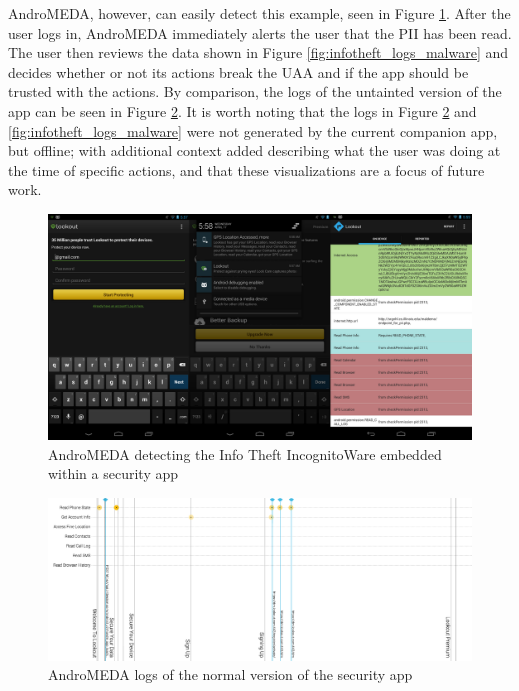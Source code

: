 \documentclass{acm_proc_article-sp}
\begin{document}
AndroMEDA, however, can easily detect this example, seen in Figure \ref{fig:infotheft_visual}. After the user logs in, AndroMEDA immediately alerts the user that the PII has been read. The user then reviews the data shown in Figure \ref{fig:infotheft_logs_malware} and decides whether or not its actions break the UAA and if the app should be trusted with the actions. By comparison, the logs of the untainted version of the app can be seen in Figure \ref{fig:infotheft_logs_nonmalware}. It is worth noting that the logs in Figure \ref{fig:infotheft_logs_nonmalware} and \ref{fig:infotheft_logs_malware} were not generated by the current companion app, but offline; with additional context added describing what the user was doing at the time of specific actions, and that these visualizations are a focus of future work.

\begin{figure}[h]
\begin{center}
\includegraphics[width=1.0\columnwidth]{figs/lookout_detection}
\caption{AndroMEDA detecting the Info Theft IncognitoWare embedded within a security app }
\label{fig:infotheft_visual}
\end{center}
\end{figure}

\begin{figure}[h]
\begin{center}
\includegraphics[width=1.0\columnwidth]{figs/AndroMEDA_Lookout_Notmalware}
\caption{AndroMEDA logs of the normal version of the security app }
\label{fig:infotheft_logs_nonmalware}
\end{center}
\end{figure}
\end{document}
